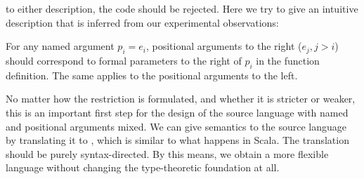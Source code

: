 to either description, the code should be rejected. Here we try to give an
intuitive description that is inferred from our experimental observations:
\begin{quoting}
For any named argument $p_i = e_i$, positional arguments to the right ($e_j,
j>i$) should correspond to formal parameters to the right of $p_i$ in the
function definition. The same applies to the positional arguments to the left.
\end{quoting}
No matter how the restriction is formulated, and whether it is stricter or
weaker, this is an important first step for the design of the source language
with named and positional arguments mixed. We can give semantics to the source
language by translating it to \lambdaiu, which is similar to what happens in
Scala. The translation should be purely syntax-directed. By this means, we
obtain a more flexible language without changing the type-theoretic foundation
at all.
